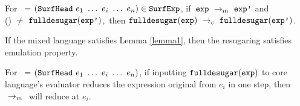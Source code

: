 \begin{lemma}
\label{lemma1}
For~ = $(\mbox{\tt SurfHead}~e_1~\ldots~e_i~\ldots~e_n)\in\mbox{\tt SurfExp}$, if~$\mbox{\tt exp} ~\rightarrow_m~\mbox{\tt exp'}$ and\\ () $\not=$ $\mbox{\tt fulldesugar}(\mbox{\tt exp'})$,~then $\mbox{\tt fulldesugar}(\mbox{\tt exp}) ~\rightarrow_c~\mbox{\tt fulldesugar}(\mbox{\tt exp'})$.

\end{lemma}

\begin{Def}[Emulation]
If the mixed language satisfies Lemma \ref{lemma1}, then the resugaring satisfies emulation property.
\end{Def}

\begin{lemma}
\label{lemma2}

For~ = $(\mbox{\tt SurfHead}~e_1~\ldots~e_i~\ldots~e_n)$, if inputting $\mbox{\tt fulldesugar}(\mbox{\tt exp})$ to core language's evaluator reduces the expression original from $e_i$ in one step, then $~\rightarrow_m~$ will reduce  at $e_i$.

\end{lemma}


